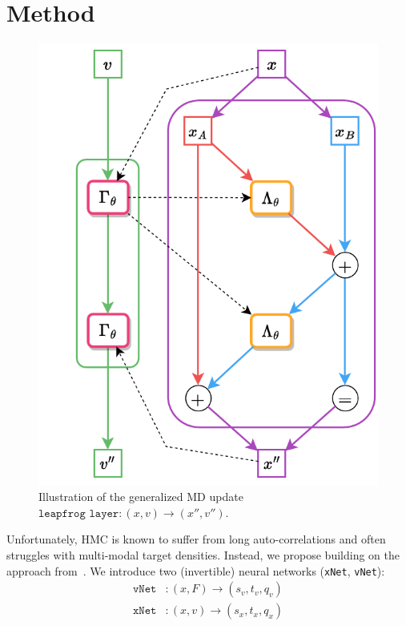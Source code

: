 \documentclass[a4paper,11pt]{article}
\begin{document}
\section{\label{sec:method}Method}
%
\begin{figure}
  \begin{center}
    \includegraphics[width=\linewidth]{assets/leapfrog-layer-alt-2}
  \end{center}
  \caption{\label{fig:lf-layer}Illustration of the generalized MD update $\texttt{leapfrog layer}: (x, v) \rightarrow (x'', v'')$.}
\end{figure}
%
Unfortunately, HMC is known to suffer from long auto-correlations and often struggles with multi-modal target densities.
%
Instead, we propose building on the approach from~\cite{L2HMC,FTHMC,etc}. We introduce two (invertible) neural networks (\texttt{xNet}, \texttt{vNet}):
%
\begin{align}
\texttt{vNet}&: (x, F) \rightarrow (s_{v}, t_{v}, q_{v}) \\
\texttt{xNet}&: (x, v) \rightarrow (s_{x}, t_{x}, q_{x})
\end{align}
\end{document}
